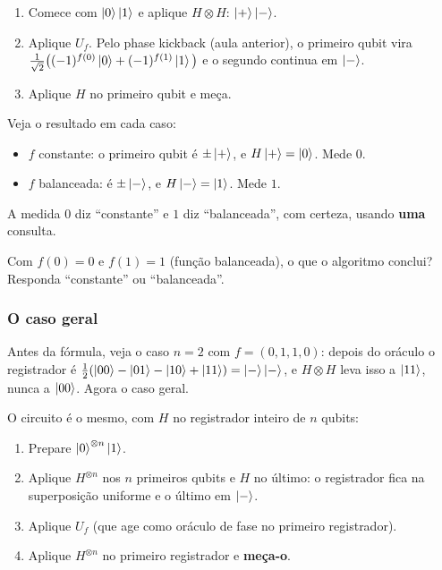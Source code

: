 \begin{enumerate}
\def\labelenumi{\arabic{enumi}.}
\tightlist
\item
  Comece com \(\left|{0}\right>\left|{1}\right>\) e aplique \(H\otimes H\): \(\left|{+}\right>\left|{-}\right>\).
\item
  Aplique \(U_f\). Pelo phase kickback (aula anterior), o primeiro qubit vira \(\tfrac{1}{\sqrt2}\big((-1)^{f(0)}\left|{0}\right>+(-1)^{f(1)}\left|{1}\right>\big)\) e o segundo continua em \(\left|{-}\right>\).
\item
  Aplique \(H\) no primeiro qubit e meça.
\end{enumerate}

Veja o resultado em cada caso:

\begin{itemize}
\tightlist
\item
  \(f\) constante: o primeiro qubit é \(\pm\left|{+}\right>\), e \(H\left|{+}\right>=\left|{0}\right>\). Mede \(0\).
\item
  \(f\) balanceada: é \(\pm\left|{-}\right>\), e \(H\left|{-}\right>=\left|{1}\right>\). Mede \(1\).
\end{itemize}

A medida \(0\) diz ``constante'' e \(1\) diz ``balanceada'', com certeza, usando \textbf{uma} consulta.

Com \(f(0)=0\) e \(f(1)=1\) (função balanceada), o que o algoritmo conclui? Responda ``constante'' ou ``balanceada''.

\subsubsection{O caso geral}\label{o-caso-geral}

Antes da fórmula, veja o caso \(n=2\) com \(f=(0,1,1,0)\): depois do oráculo o registrador é \(\tfrac12(\left|{00}\right>-\left|{01}\right>-\left|{10}\right>+\left|{11}\right>)=\left|{-}\right>\left|{-}\right>\), e \(H\otimes H\) leva isso a \(\left|{11}\right>\), nunca a \(\left|{00}\right>\). Agora o caso geral.

O circuito é o mesmo, com \(H\) no registrador inteiro de \(n\) qubits:

\begin{enumerate}
\def\labelenumi{\arabic{enumi}.}
\tightlist
\item
  Prepare \(\left|{0}\right>^{\otimes n}\left|{1}\right>\).
\item
  Aplique \(H^{\otimes n}\) nos \(n\) primeiros qubits e \(H\) no último: o registrador fica na superposição uniforme e o último em \(\left|{-}\right>\).
\item
  Aplique \(U_f\) (que age como oráculo de fase no primeiro registrador).
\item
  Aplique \(H^{\otimes n}\) no primeiro registrador e \textbf{meça-o}.
\end{enumerate}

